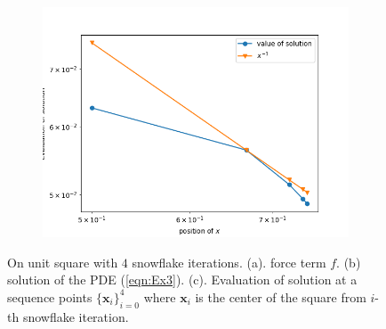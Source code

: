 \documentclass[12pt]{article}%
\theoremstyle{plain}
\numberwithin{equation}{section}
\begin{document}
\begin{figure}[H]
\begin{subfigure}[h]{0.45\linewidth}
\includegraphics[width=\linewidth]{figures/Ex3/Ex3_evaluate_2.png}
\end{subfigure}
  \caption{On unit square with $4$ snowflake iterations.   (a). force term $f$. (b) solution of the PDE (\ref{eqn:Ex3}). (c). Evaluation of solution at a sequence points $\{\textbf{x}_i\}_{i=0}^4$ where $\textbf{x}_i$ is the center of the square from $i$-th snowflake iteration. }
  \label{Ex3_solution_v2}
 \end{figure}
   


\end{document}
